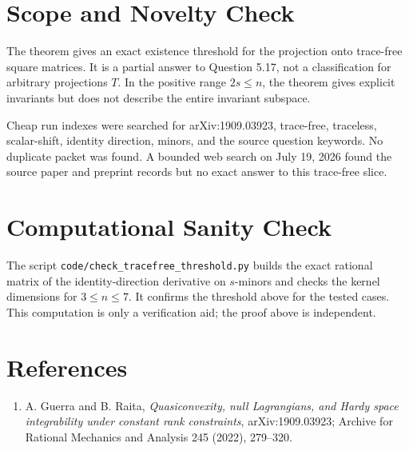 \documentclass[11pt]{article}
\begin{document}
\section*{Scope and Novelty Check}

The theorem gives an exact existence threshold for the projection onto
trace-free square matrices. It is a partial answer to Question 5.17, not a
classification for arbitrary projections $T$. In the positive range
$2s\le n$, the theorem gives explicit invariants but does not describe the
entire invariant subspace.

Cheap run indexes were searched for arXiv:1909.03923, trace-free, traceless,
scalar-shift, identity direction, minors, and the source question keywords. No
duplicate packet was found. A bounded web search on July 19, 2026 found the
source paper and preprint records but no exact answer to this trace-free slice.

\section*{Computational Sanity Check}

The script \texttt{code/check\_tracefree\_threshold.py} builds the exact
rational matrix of the identity-direction derivative on $s$-minors and checks
the kernel dimensions for $3\le n\le7$. It confirms the threshold above for the
tested cases. This computation is only a verification aid; the proof above is
independent.

\section*{References}

\begin{enumerate}
\item A. Guerra and B. Raita,
\emph{Quasiconvexity, null Lagrangians, and Hardy space integrability under
constant rank constraints}, arXiv:1909.03923; Archive for Rational Mechanics
and Analysis 245 (2022), 279--320.
\end{enumerate}
\end{document}

